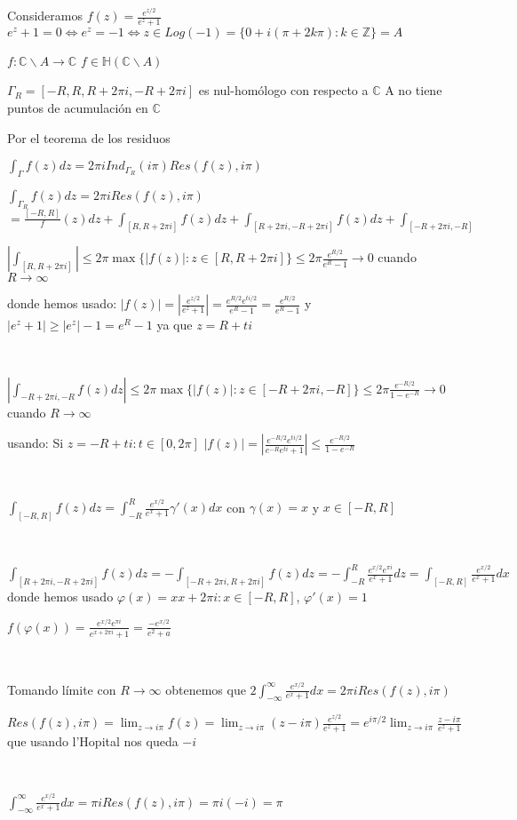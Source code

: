 Consideramos 
$f(z) = \frac{e^{z/2}}{e^z+1}$
$e^z+1=0 \Longleftrightarrow e^z = -1 \Longleftrightarrow z\in Log(-1) = \{ 0+i(\pi+2k\pi) : k\in\mathbb{Z} \} = A$

$f : \mathbb{C}\backslash A \rightarrow \mathbb{C}$
$f\in\mathbb{H}(\mathbb{C}\backslash A)$

$\Gamma_R  = [-R,R,R+2\pi i, -R+2\pi i]$ es nul-homólogo con respecto a $\mathbb{C}$
A no tiene puntos de acumulación en $\mathbb{C}$

Por el teorema de los residuos

$\int_{\Gamma} f(z)dz = 2\pi i Ind_{\Gamma_R}(i\pi) Res(f(z),i\pi)$

$\int_{\Gamma_R} f(z)dz = 2\pi i Res(f(z),i\pi)$
$= \frac{[-R,R]} f(z)dz + \int_{[R,R+2\pi i]} f(z)dz + \int_{[R+2\pi i, -R+2\pi i]} f(z)dz + \int_{[-R+2\pi i, -R]}$


$\left| \int_{[R,R+2\pi i]} \right| \leq 2\pi\max\{ |f(z)| : z\in [R,R+2\pi i] \} \leq 2\pi \frac{e^{R/2}}{e^R-1} \rightarrow 0$ cuando $R\rightarrow \infty$

donde hemos usado:
$|f(z)| = |\frac{e^{z/2}}{e^z+1}| = \frac{e^{R/2} e^{ti/2}}{e^R-1} = \frac{e^{R/2}}{e^R-1}$
y
$|e^z+1| \geq |e^z|-1 = e^R-1$ ya que $z=R+ti$


\

$\left| \int_{-R+2\pi i, -R} f(z)dz \right| \leq 2\pi \max \{ |f(z)| : z\in[-R+2\pi i, -R] \} \leq 2\pi \frac{e^{-R/2}}{1-e^{-R}} \rightarrow 0$ cuando $R\rightarrow\infty$

usando:
Si $z= -R+ti : t\in[0,2\pi]$
$|f(z)| = \left| \frac{e^{-R/2}e^{ti/2}}{e^{-R}e^{ti}+1} \right| \leq \frac{e^{-R/2}}{1-e^{-R}}$

\

$\int_{[-R,R]} f(z)dz = \int_{-R}^{R} \frac{e^{x/2}}{e^x+1} \gamma'(x)dx$ con $\gamma(x)=x$ y $x\in[-R,R]$

\

$\int_{[R+2\pi i, -R+2\pi i]} f(z)dz = -\int_{[-R+2\pi i, R+2\pi i]} f(z)dz = -\int_{-R}^{R} \frac{e^{x/2}e^{\pi i}}{e^x+1}dz = \int_{[-R,R]} \frac{e^{x/2}}{e^x+1}dx$
donde hemos usado
$\varphi (x) = xx+2\pi i : x\in[-R,R]$, $\varphi'(x) = 1$

$f(\varphi(x)) = \frac{e^{x/2}e^{\pi i}}{e^{x+2\pi i}+1} = \frac{-e^{x/2}}{e^2+a}$

\

Tomando límite con $R\rightarrow\infty$ obtenemos que
$2\int_{-\infty}^{\infty} \frac{e^{x/2}}{e^x+1} dx = 2\pi iRes(f(z),i\pi)$

$Res(f(z),i\pi) = \lim_{z\rightarrow i\pi} f(z) = \lim_{z\rightarrow i\pi} (z-i\pi) \frac{e^{z/2}}{e^z+1} = e^{i\pi/2} \lim_{z\rightarrow i\pi} \frac{z-i\pi}{e^z+1}$
que usando l'Hopital nos queda
$-i$

\

$\int_{-\infty}^{\infty} \frac{e^{x/2}}{e^x+1} dx = \pi iRes(f(z),i\pi) = \pi i(-i) = \pi $

